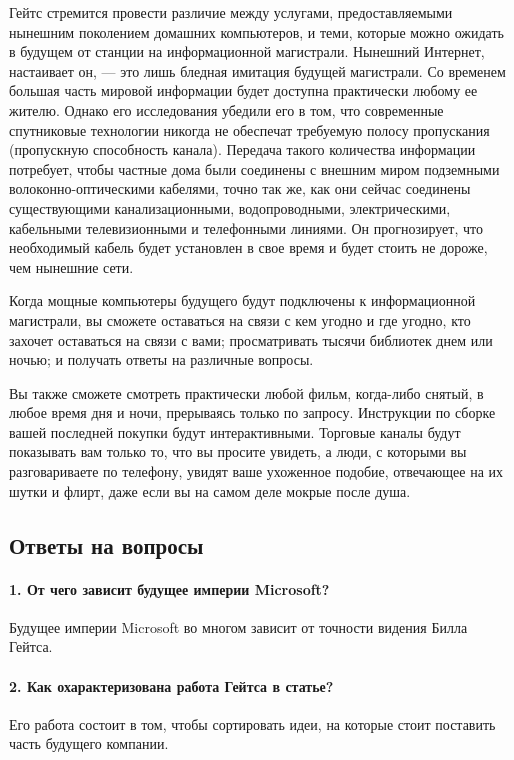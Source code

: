 Гейтс стремится провести различие между услугами, предоставляемыми нынешним поколением домашних компьютеров, и теми, которые можно ожидать в будущем от станции на информационной магистрали. Нынешний Интернет, настаивает он, --- это лишь бледная имитация будущей магистрали. Со временем большая часть мировой информации будет доступна практически любому ее жителю. Однако его исследования убедили его в том, что современные спутниковые технологии никогда не обеспечат требуемую полосу пропускания (пропускную способность канала). Передача такого количества информации потребует, чтобы частные дома были соединены с внешним миром подземными волоконно-оптическими кабелями, точно так же, как они сейчас соединены существующими канализационными, водопроводными, электрическими, кабельными телевизионными и телефонными линиями. Он прогнозирует, что необходимый кабель будет установлен в свое время и будет стоить не дороже, чем нынешние сети.


Когда мощные компьютеры будущего будут подключены к информационной магистрали, вы сможете оставаться на связи с кем угодно и где угодно, кто захочет оставаться на связи с вами; просматривать тысячи библиотек днем или ночью; и получать ответы на различные вопросы.


Вы также сможете смотреть практически любой фильм, когда-либо снятый, в любое время дня и ночи, прерываясь только по запросу. Инструкции по сборке вашей последней покупки будут интерактивными. Торговые каналы будут показывать вам только то, что вы просите увидеть, а люди, с которыми вы разговариваете по телефону, увидят ваше ухоженное подобие, отвечающее на их шутки и флирт, даже если вы на самом деле мокрые после душа.

\subsection*{Ответы на вопросы}
    \paragraph{1. От чего зависит будущее империи Microsoft?}
    Будущее империи Microsoft во многом зависит от точности видения Билла Гейтса.
    
    \paragraph{2. Как охарактеризована работа Гейтса в статье?}
    Его работа состоит в том, чтобы сортировать идеи, на которые стоит поставить часть будущего компании. 
    
